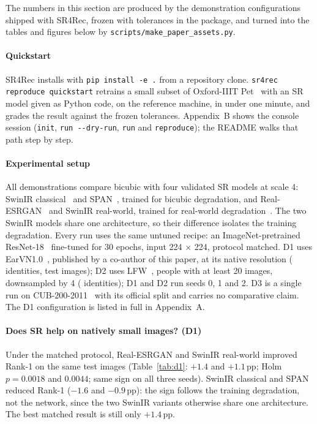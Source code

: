 \documentclass[preprint,12pt]{elsarticle}
\begin{document}
The numbers in this section are produced by the demonstration configurations shipped with SR4Rec,
frozen with tolerances in the package, and turned into the tables and figures below by
\texttt{scripts/make\_paper\_assets.py}.

\paragraph{Quickstart} SR4Rec installs with \texttt{pip install -e .} from a repository clone.
\texttt{sr4rec reproduce quickstart} retrains a small subset of Oxford-IIIT Pet~\cite{parkhi2012pets}
with an SR model given as Python code, on the reference machine, in under one minute, and grades
the result against the frozen tolerances. Appendix~B shows the console session (\texttt{init},
\texttt{run -{}-dry-run}, \texttt{run} and \texttt{reproduce}); the README walks that path step by
step.

\paragraph{Experimental setup} All demonstrations compare bicubic with four validated SR models
at scale 4: SwinIR classical~\cite{liang2021swinir} and SPAN~\cite{wan2024span}, trained for bicubic
degradation, and Real-ESRGAN~\cite{wang2021realesrgan} and SwinIR real-world, trained for real-world
degradation~\cite{zhang2021bsrgan}. The two SwinIR models share one architecture, so their difference
isolates the training degradation. Every run uses the same untuned recipe: an ImageNet-pretrained
ResNet-18~\cite{he2016resnet} fine-tuned for 30 epochs, input 224 $\times$ 224, protocol matched.
D1 uses EarVN1.0~\cite{hoang2019earvn}, published by a co-author of this paper, at its native
resolution (\DONENumClasses{} identities,
\DONENumTest{} test images); D2 uses LFW~\cite{huang2007lfw}, people with at least 20 images,
downsampled by 4 (\DTWONumClasses{} identities); D1 and D2 run seeds 0, 1 and 2. D3 is a single run
on CUB-200-2011~\cite{wah2011cub} with its official split and carries no comparative claim. The D1
configuration is listed in full in Appendix~A.

\paragraph{Does SR help on natively small images? (D1)} Under the matched protocol, Real-ESRGAN and
SwinIR real-world improved Rank-1 on the same \DONENumTest{} test images (Table~\ref{tab:d1}:
$+1.4$ and $+1.1$\,pp; Holm $p=0.0018$ and $0.0044$; same sign on all three seeds). SwinIR
classical and SPAN reduced Rank-1 ($-1.6$ and $-0.9$\,pp): the sign follows the training
degradation, not the network, since the two SwinIR variants otherwise share one architecture. The
best matched result is still only $+1.4$\,pp.
\end{document}
